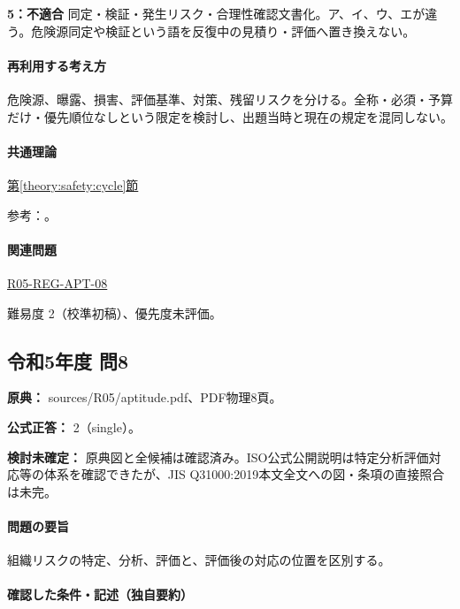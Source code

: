 \noindent\textbf{5：不適合} 同定・検証・発生リスク・合理性確認文書化。ア、イ、ウ、エが違う。危険源同定や検証という語を反復中の見積り・評価へ置き換えない。\par

\paragraph{再利用する考え方} 危険源、曝露、損害、評価基準、対策、残留リスクを分ける。全称・必須・予算だけ・優先順位なしという限定を検討し、出題当時と現在の規定を混同しない。

\paragraph{共通理論} \hyperref[theory:safety:cycle]{第\ref*{theory:safety:cycle}節}

\par 参考：\cite{saf_ra2006,saf_guide51}。

\paragraph{関連問題} \hyperref[q:r05-reg-apt-08]{R05-REG-APT-08}

\par 難易度 2（校準初稿）、優先度未評価。

\subsection{令和5年度 問8}
\label{q:r05-reg-apt-08}

\noindent\textbf{原典：} sources/R05/aptitude.pdf、PDF物理8頁。

\textbf{公式正答：} 2（single）。

\par\textbf{検討未確定：} 原典図と全候補は確認済み。ISO公式公開説明は特定分析評価対応等の体系を確認できたが、JIS Q31000:2019本文全文への図・条項の直接照合は未完。

\paragraph{問題の要旨} 組織リスクの特定、分析、評価と、評価後の対応の位置を区別する。

\paragraph{確認した条件・記述（独自要約）}\mbox{}\par


